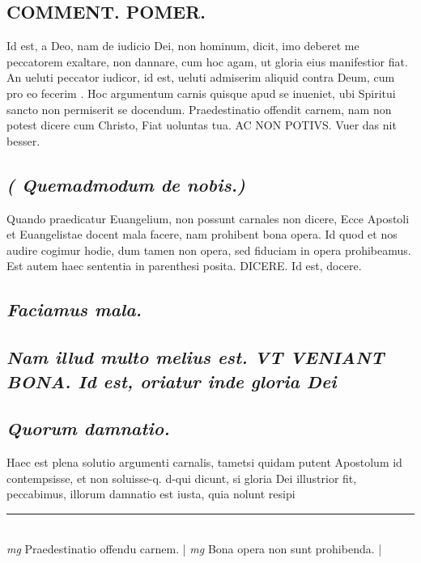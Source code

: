 \documentclass{article}
\begin{document}
\begin{pages}
\section*{COMMENT. POMER.  }\pstart Id est, a Deo, nam de iudicio Dei, non hominum, dicit, imo deberet me peccatorem exaltare, non dannare, cum hoc agam, ut gloria eius manifestior fiat.  An ueluti peccator iudicor, id est, ueluti admiserim aliquid contra Deum, cum pro eo fecerim . Hoc argumentum carnis quisque apud se inueniet, ubi Spiritui sancto non permiserit se docendum. Praedestinatio offendit carnem, nam non potest dicere cum Christo, Fiat uoluntas tua. AC NON POTIVS.  Vuer das nit besser.   \pend
{}
{}
\subsection*{\textit{( Quemadmodum de nobis.) }}\pstart Quando praedicatur Euangelium, non possunt carnales non dicere, Ecce Apostoli et Euangelistae docent mala facere, nam prohibent bona opera. Id quod et nos audire cogimur hodie, dum tamen non opera, sed fiduciam in opera prohibeamus. Est autem haec sententia in parenthesi posita. DICERE.  Id est, docere.   \pend
{}
{}
\subsection*{\textit{Faciamus mala. }}
{}
\subsection*{\textit{Nam illud multo melius est. VT VENIANT BONA. Id est, oriatur inde gloria Dei}}
{}
\subsection*{\textit{Quorum damnatio. }}\pstart Haec est plena solutio argumenti carnalis, tametsi quidam putent Apostolum id contempsisse, et non soluisse-q. d-qui dicunt, si gloria Dei illustrior fit, peccabimus, illorum damnatio est iusta, quia nolunt resipi  \pend
\vspace{0.5cm}\noindent
\vspace{0.2cm}\rule{1cm}{0.2pt}\\ 
\hspace{0.2cm}\textit{mg}
\footnotesize Praedestinatio offendu carnem.  
\normalsize| 
\hspace{0.2cm}\textit{mg}
\footnotesize Bona opera non sunt prohibenda.  
\normalsize| 

\end{pages}
\end{document}
